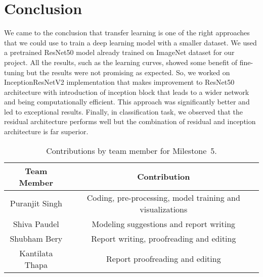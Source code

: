 \documentclass{report}
\begin{document}
\section{Conclusion}
We came to the conclusion that transfer learning is one of the right approaches that we could use to train a deep learning model with a smaller dataset. We used a pretrained ResNet50 model already trained on ImageNet dataset for our project. All the results, such as the learning curves, showed some benefit of fine-tuning but the results were not promising as expected. So, we worked on InceptionResNetV2 implementation that makes improvement to ResNet50 architecture with introduction of inception block that leads to a wider network and being computationally efficient. This approach was significantly better and led to exceptional results. Finally, in classification task, we observed that the residual architecture performs well but the combination of residual and inception architecture is far superior. 



\begin{table}[h]
    \caption{Contributions by team member for Milestone~5.}
    \centering
    \begin{tabular}{|c|c|} \hline
    {\bf Team Member}     &  {\bf Contribution}  \\ \hline
    Puranjit Singh     &  Coding, pre-processing, model training and visualizations \\
    Shiva Paudel     &  Modeling suggestions and report writing \\
    Shubham Bery     &  Report writing, proofreading and editing \\
    Kantilata Thapa     &  Report proofreading and editing \\ \hline
    \end{tabular}
    \label{tab:contribution5}
\end{table}
\iffalse
\appendix

\chapter{First Appendix}

An appendix is used only if necessary (remove this chapter if you don't use one). It contains supplementary materials/extra details such as extensive experimental results (e.g., hyper-parameter search results, where the most interesting ones are in the main text and the rest are dumped here), detailed proofs, etc. 

Create as many appendices as needed by adding chapters. All such chapters must be before the bibliography. 

\fi


\end{document}
